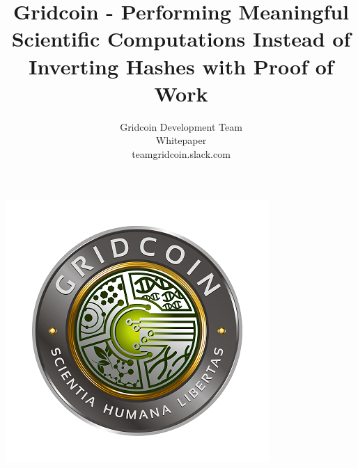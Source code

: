 \documentclass[10pt,a4paper]{article}
\begin{document}
\pagestyle{headings}




\title{Gridcoin - Performing Meaningful Scientific Computations Instead of Inverting Hashes with Proof of Work}

\author{Gridcoin Development Team\\
Whitepaper\\
teamgridcoin.slack.com\\}


\maketitle



\begin{center}
\includegraphics{figures/gridcoin-art-small}
\end{center}



















\newpage




\end{document}
